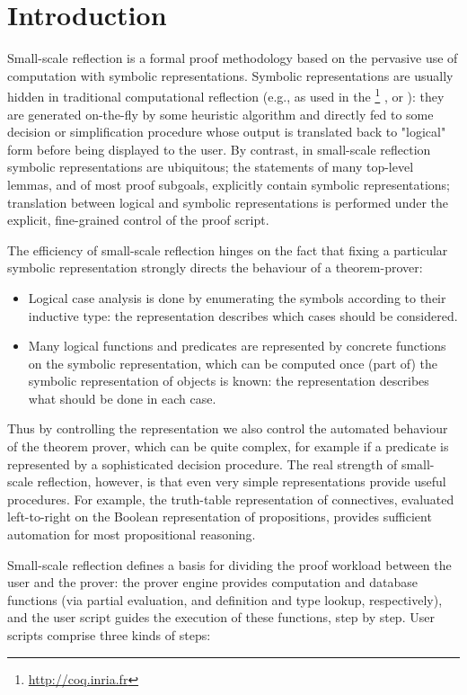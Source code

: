 \section{Introduction}\label{sec:intro}
Small-scale reflection is a formal proof methodology based on the
pervasive use of computation with symbolic representations. Symbolic
representations are usually hidden in traditional computational
reflection (e.g., as used in the
\Coq{}\footnote{\url{http://coq.inria.fr}} , or ):
they are generated on-the-fly by some heuristic algorithm and directly
fed to some decision or simplification procedure whose output is
translated back to "logical" form before being displayed to the
user. By contrast, in small-scale reflection symbolic representations
are ubiquitous; the statements of many top-level lemmas, and of most
proof subgoals, explicitly contain symbolic representations;
translation between logical and symbolic representations is performed
under the explicit, fine-grained control of the proof script.

The efficiency of small-scale reflection hinges on the fact that
fixing a particular symbolic representation strongly directs the
behaviour of a theorem-prover: 

\begin{itemize}
\item Logical case analysis is done by
enumerating the symbols according to their inductive type: the
representation describes which cases should be considered.  
\item Many
logical functions and predicates are represented by concrete
functions on the symbolic representation, which can be computed once
(part of) the symbolic representation of objects is known: the
representation describes what should be done in each case. 
\end{itemize}

Thus by controlling the representation we also control the automated
behaviour of the theorem prover, which can be quite complex,
for example if a predicate is represented by a sophisticated decision
procedure. The real strength of small-scale reflection, however, is
that even very simple representations provide useful procedures. For
example, the truth-table representation of connectives, evaluated
left-to-right
on the Boolean representation of propositions, provides sufficient
automation for most propositional reasoning.

Small-scale reflection defines a basis for dividing the proof workload
between the user and the prover: the prover engine provides computation
and database functions (via partial evaluation, and definition and
type lookup, respectively), and the user script guides the execution
of these functions, step by step. User scripts comprise three kinds of
steps: 

